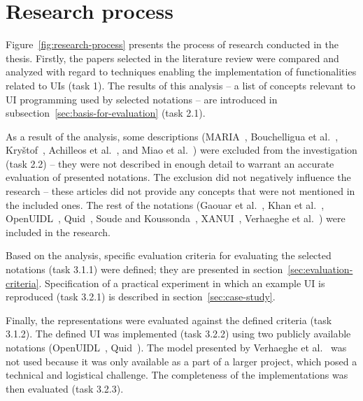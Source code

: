 \section{Research process}\label{sec:research-process}

Figure~\ref{fig:research-process} presents the process of research conducted in the thesis.
Firstly, the papers selected in the literature review were compared and analyzed with regard to techniques enabling the implementation of functionalities related to UIs (task 1).
The results of this analysis -- a list of concepts relevant to UI programming used by selected notations -- are introduced in subsection~\ref{sec:basis-for-evaluation} (task 2.1).

As a result of the analysis, some descriptions (MARIA~\cite{Paterno2009, MariaPDF}, Bouchelligua et al.~\cite{Bouchelligua2010}, Kryštof~\cite{kryvstof2010lpgm}, Achilleos et al.~\cite{Achilleos2011}, and Miao et al.~\cite{Miao2017}) were excluded from the investigation (task 2.2) -- they were not described in enough detail to warrant an accurate evaluation of presented notations.
The exclusion did not negatively influence the research -- these articles did not provide any concepts that were not mentioned in the included ones.
The rest of the notations (Gaouar et al.~\cite{Gaouar2018}, Khan et al.~\cite{Khan2021}, OpenUIDL~\cite{Moldovan2020}, Quid~\cite{molina2018quid, Molina2019}, Soude and Koussonda~\cite{Soude2022}, XANUI~\cite{hermida2016xanui}, Verhaeghe et al.~\cite{Verhaeghe2021visual, Verhaeghe2021behavior}) were included in the research.

Based on the analysis, specific evaluation criteria for evaluating the selected notations (task 3.1.1) were defined; they are presented in section~\ref{sec:evaluation-criteria}.
Specification of a practical experiment in which an example UI is reproduced (task 3.2.1) is described in section~\ref{sec:case-study}.

Finally, the representations were evaluated against the defined criteria (task 3.1.2).
The defined UI was implemented (task 3.2.2) using two publicly available notations (OpenUIDL~\cite{Moldovan2020}, Quid~\cite{molina2018quid, Molina2019}).
The model presented by Verhaeghe et al.~\cite{Verhaeghe2021visual, Verhaeghe2021behavior} was not used because it was only available as a part of a larger project, which posed a technical and logistical challenge.
The completeness of the implementations was then evaluated (task 3.2.3).

